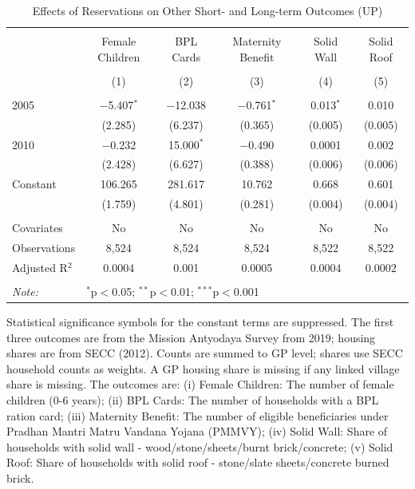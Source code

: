 \begin{table}[!htbp]
\centering
\begin{threeparttable}

  \caption{Effects of Reservations on Other Short- and Long-term Outcomes (UP)} 
  \label{up_shrug_other_05_10} 
\scriptsize 
\begin{tabular}{@{\extracolsep{0pt}}lccccc} 
\\[-1.8ex]\hline 
\hline \\[-1.8ex] 
 & Female Children & BPL Cards & Maternity Benefit & Solid Wall & Solid Roof \\ 
\\[-1.8ex] & (1) & (2) & (3) & (4) & (5)\\ 
\hline \\[-1.8ex] 
 2005 & $-$5.407$^{*}$ & $-$12.038 & $-$0.761$^{*}$ & 0.013$^{*}$ & 0.010 \\ 
  & (2.285) & (6.237) & (0.365) & (0.005) & (0.005) \\ 
  2010 & $-$0.232 & 15.000$^{*}$ & $-$0.490 & 0.0001 & 0.002 \\ 
  & (2.428) & (6.627) & (0.388) & (0.006) & (0.006) \\ 
  Constant & 106.265 & 281.617 & 10.762 & 0.668 & 0.601 \\ 
  & (1.759) & (4.801) & (0.281) & (0.004) & (0.004) \\ 
 \hline \\[-1.8ex] 
Covariates & No & No & No & No & No \\ 
Observations & 8,524 & 8,524 & 8,524 & 8,522 & 8,522 \\ 
Adjusted R$^{2}$ & 0.0004 & 0.001 & 0.0005 & 0.0004 & 0.0002 \\ 
\hline 
\hline \\[-1.8ex] 
\textit{Note:}  & \multicolumn{5}{l}{$^{*}$p$<$0.05; $^{**}$p$<$0.01; $^{***}$p$<$0.001} \\ 
\end{tabular} 
\begin{tablenotes}[flushleft]
\scriptsize
\item[] Statistical significance symbols for the constant terms are suppressed. The first three outcomes are from the Mission Antyodaya Survey from
    2019; housing shares are from SECC (2012). Counts are summed to GP
    level; shares use SECC household counts as weights. A GP housing
    share is missing if any linked village share is missing. The outcomes
    are: (i) Female Children: The number of female children (0-6 years);
    (ii) BPL Cards: The number of households with a BPL ration card;
    (iii) Maternity Benefit: The number of eligible beneficiaries under
    Pradhan Mantri Matru Vandana Yojana (PMMVY); (iv) Solid Wall: Share
    of households with solid wall - wood/stone/sheets/burnt
    brick/concrete; (v) Solid Roof: Share of households with solid roof -
    stone/slate sheets/concrete burned brick.
\end{tablenotes}
\end{threeparttable}
\end{table}
